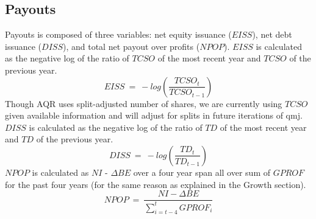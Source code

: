 \documentclass[12pt]{article}
\begin{document}
\subsection*{Payouts}
Payouts is composed of three variables: net equity issuance ($EISS$), net debt issuance ($DISS$), and total net payout over profits ($NPOP$). $EISS$ is calculated as the negative log of the ratio of $TCSO$ of the most recent year and $TCSO$ of the previous year. $$EISS \ = \ -log\left(\frac{TCSO_t}{TCSO_{t-1}}\right)$$ Though AQR uses split-adjusted number of shares, we are currently using $TCSO$ given available information and will adjust for splits in future iterations of qmj. $DISS$ is calculated as the negative log of the ratio of $TD$ of the most recent year and $TD$ of the previous year. $$DISS \ = \ -log\left(\frac{TD_t}{TD_{t-1}}\right)$$ $NPOP$ is calculated as $NI$ - $\Delta BE$ over a four year span all over sum of $GPROF$ for the past four years (for the same reason as explained in the Growth section). $$NPOP \ = \ \frac{NI - \Delta BE}{\sum_{i=t-4}^{t}GPROF_i}$$
\end{document}
